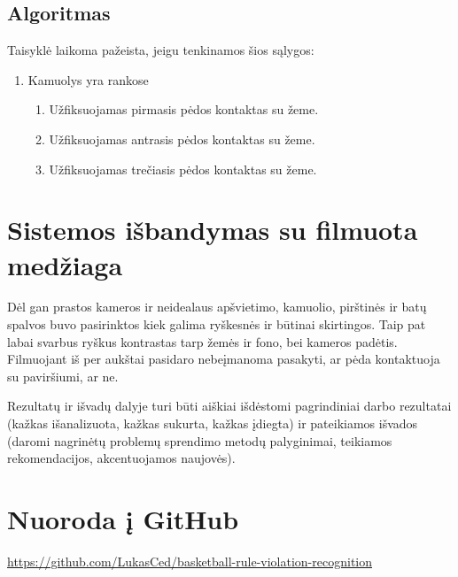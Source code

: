 \documentclass{VUMIFPSkursinis}
\begin{document}
\subsection{Algoritmas}
	Taisyklė laikoma pažeista, jeigu tenkinamos šios sąlygos:
	\begin{enumerate}
	\item Kamuolys yra rankose
		\begin{enumerate}
			\item Užfiksuojamas pirmasis pėdos kontaktas su žeme.
			\item Užfiksuojamas antrasis pėdos kontaktas su žeme.
			\item Užfiksuojamas trečiasis pėdos kontaktas su žeme.
		\end{enumerate}
\end{enumerate}

\section{Sistemos išbandymas su filmuota medžiaga}
Dėl gan prastos kameros ir neidealaus apšvietimo, kamuolio, pirštinės ir batų spalvos buvo pasirinktos kiek galima ryškesnės ir būtinai skirtingos. Taip pat labai svarbus ryškus kontrastas tarp žemės ir fono, bei kameros padėtis. Filmuojant iš per aukštai pasidaro nebeįmanoma pasakyti, ar pėda kontaktuoja su paviršiumi, ar ne. 

Rezultatų ir išvadų dalyje turi būti aiškiai išdėstomi pagrindiniai darbo
rezultatai (kažkas išanalizuota, kažkas sukurta, kažkas įdiegta) ir pateikiamos
išvados (daromi nagrinėtų problemų sprendimo metodų palyginimai, teikiamos
rekomendacijos, akcentuojamos naujovės).

\printbibliography[heading=bibintoc]  %

\appendix  %
\section{Nuoroda į GitHub}
\url{https://github.com/LukasCed/basketball-rule-violation-recognition}
\end{document}
